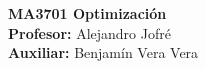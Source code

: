\noindent \textbf{MA3701 Optimización}\\
\textbf{Profesor:} Alejandro Jofré\\
\textbf{Auxiliar:} Benjamín Vera Vera
